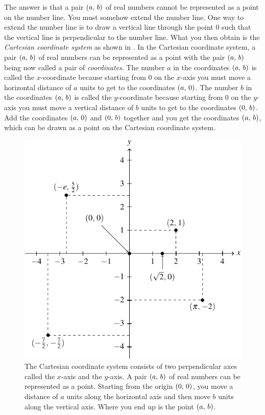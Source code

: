 \documentclass[a4paper,oneside,12pt]{article}
\begin{document}
The answer is that a pair $\left\lparen{a},\, {b}\right\rparen$ of real numbers cannot be
represented as a point on the number line.  You must somehow extend
the number line.  One way to extend the number line is to draw a
vertical line through the point $0$ such that the vertical line is
perpendicular to the number line.  What you then obtain is the
\emph{Cartesian coordinate system} as shown in
.  In the Cartesian coordinate
system, a pair $\left\lparen{a},\, {b}\right\rparen$ of real numbers can be represented as a
point with the pair $\left\lparen{a},\, {b}\right\rparen$ being now called a pair of
\emph{coordinates}.  The number $a$ in the coordinates $\left\lparen{a},\, {b}\right\rparen$
is called the $x$-coordinate because starting from $0$ on the
$x$-axis you must move a horizontal distance of $a$ units to get to
the coordinates $\left\lparen{a},\, {0}\right\rparen$.  The number $b$ in the coordinates
$\left\lparen{a},\, {b}\right\rparen$ is called the $y$-coordinate because starting from $0$
on the $y$-axis you must move a vertical distance of $b$ units to get
to the coordinates $\left\lparen{0},\, {b}\right\rparen$.  Add the coordinates $\left\lparen{a},\, {0}\right\rparen$
and $\left\lparen{0},\, {b}\right\rparen$ together and you get the coordinates
$\left\lparen{a},\, {b}\right\rparen$, which can be drawn as a point on the Cartesian
coordinate system.

\begin{figure}[!htbp]
\centering
\includegraphics[scale=1.1]{image/03/cartesian-coordinate.pdf}
\caption{%
  The Cartesian coordinate system consists of two perpendicular axes
  called the $x$-axis and the $y$-axis.  A pair $\left\lparen{a},\, {b}\right\rparen$ of real
  numbers can be represented as a point.  Starting from the origin
  $\left\lparen{0},\, {0}\right\rparen$, you move a distance of $a$ units along the
  horizontal axis and then move $b$ units along the vertical axis.
  Where you end up is the point $\left\lparen{a},\, {b}\right\rparen$.
}
\label{fig:Cartesian_coordinate_system}
\end{figure}
\end{document}
